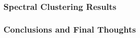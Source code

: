 \documentclass{beamer}
\begin{document}

\begin{frame}
	\frametitle{Spectral Clustering Results}
\begin{figure}[h]
	\begin{center}	
	\end{center}
\end{figure} 
\end{frame}


\begin{frame}
	\frametitle{Conclusions and Final Thoughts}
\end{frame}
\end{document}
